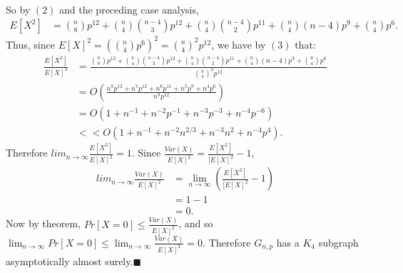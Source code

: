 \documentclass[letterpaper,12pt,oneside,onecolumn]{report}
\begin{document}
\paragraph{}
So by $(2)$ and the preceding case analysis,
\begin{align}
E[X^2] &= {n \choose 8}p^{12} + {n \choose 4}{n-4 \choose 3}p^{12} + {n \choose 4}{n-4 \choose 2}p^{11} + {n \choose 4}(n-4)p^{9} + {n \choose 4}p^{6} .
\end{align}
Thus, since $E[X]^2 = ({n \choose 4} p^6)^2  = {n \choose 4}^2 p^{12}$, we have by $(3)$ that:
\begin{align*}
\frac{E[X^2]}{E[X]^2} &= \frac{{n \choose 8}p^{12} + {n \choose 4}{n-4 \choose 3}p^{12} + {n \choose 4}{n-4 \choose 2}p^{11} + {n \choose 4}(n-4)p^{9} + {n \choose 4}p^{6}}{{n \choose 4}^2 p^{12}} \\
&= O(\frac{n^8p^{12} + n^7p^{12} + n^6p^{11} + n^5p^{9} + n^4p^{6}}{n^8 p^{12}}) \\
&= O(1 + n^{-1} + n^{-2}p^{-1} + n^{-3}p^{-3} + n^{-4}p^{-6}) \\
&<< O(1 + n^{-1} + n^{-2}n^{2/3} + n^{-3}n^2 + n^{-4}p^4).
\end{align*}
Therefore $lim_{n \to \infty} \frac{E[X^2]}{E[X]^2} = 1$. Since $\frac{Var(X)}{E[X]^2} = \frac{E[X^2]}{[E[X]^2} - 1$,
\begin{align*}
lim_{n \to \infty} \frac{Var(X)}{E[X]^2} &= \lim_{n \to \infty} ( \frac{E[X^2]}{[E[X]^2} - 1) \\
&= 1 - 1 \\
&= 0.
\end{align*}
Now by theorem, $Pr[X = 0] \leq \frac{Var(X)}{E[X]^2}$, and so $\lim_{n \to \infty} Pr[X = 0] \leq \lim_{n \to \infty} \frac{Var(X)}{E[X]^2} = 0$. Therefore $G_{n,p}$ has a $K_4$ subgraph asymptotically almost surely.$\blacksquare$
\end{document}
